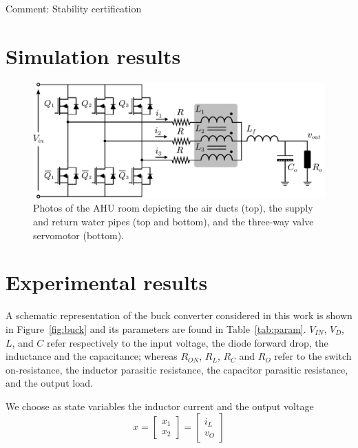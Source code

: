 Comment: Stability certification

\section{Simulation results}


\begin{figure}[!t]
	\centering
	\includegraphics[width=0.7\linewidth]{../images/chap4_simres_multicelldcdc}
	\caption{Photos of the AHU room depicting the air ducts (top), the supply and return water pipes (top and bottom), and the three-way valve servomotor (bottom).}
	\label{fig.asd}
\end{figure}

\section{Experimental results}


A schematic representation of the buck converter considered in this work is shown in Figure~\ref{fig:buck} and its parameters are found in Table~\ref{tab:param}. $V_{IN}$, $V_D$, $L$, and $C$ refer respectively to the input voltage, the diode forward drop, the inductance and the capacitance; whereas $R_{ON}$, $R_L$, $R_C$ and $R_{O}$ refer to the switch on-resistance, the inductor parasitic resistance, the capacitor parasitic resistance, and the output load.

We choose as state variables the inductor current and the output voltage
\begin{equation}
	x = \begin{bmatrix} x_1 \\ x_2 \end{bmatrix}
	= \begin{bmatrix} i_L \\ v_O \end{bmatrix}
\end{equation}


